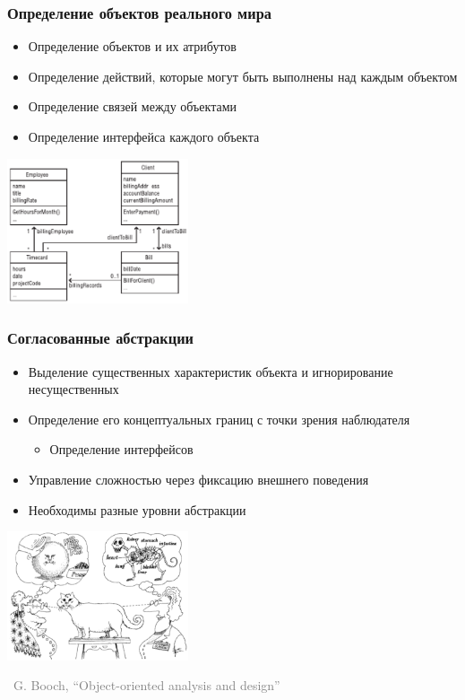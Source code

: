 \documentclass[xetex,mathserif,serif]{beamer}
\newcommand{\attribution}[1] {
\vspace{-5mm}\begin{flushright}\begin{scriptsize}\textcolor{gray}{\textcopyright\, #1}\end{scriptsize}\end{flushright}
}
\begin{document}
	\begin{frame}
		\frametitle{Определение объектов реального мира}
		\begin{itemize}
			\item Определение объектов и их атрибутов
			\item Определение действий, которые могут быть выполнены над каждым объектом
			\item Определение связей между объектами
			\item Определение интерфейса каждого объекта
		\end{itemize}
		\begin{center}
			\includegraphics[width=0.4\textwidth]{billDomainModel.png}
		\end{center}
	\end{frame}

	\begin{frame}
		\frametitle{Согласованные абстракции}
		\begin{itemize}
			\item Выделение существенных характеристик объекта и игнорирование несущественных
			\item Определение его концептуальных границ с точки зрения наблюдателя
			\begin{itemize}
				\item Определение интерфейсов
			\end{itemize}
			\item Управление сложностью через фиксацию внешнего поведения
			\item Необходимы разные уровни абстракции
		\end{itemize}
		\begin{center}
			\includegraphics[width=0.4\textwidth]{abstraction.png}
			\attribution{G. Booch, ``Object-oriented analysis and design''}
		\end{center}
	\end{frame}
\end{document}

